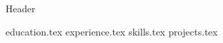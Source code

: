 {Header}


\makecvheader
\vspace{10pt}

{education.tex}
\vspace{4pt}
{experience.tex}
\vspace{4pt}
{skills.tex}
\vspace{4pt}
{projects.tex}


